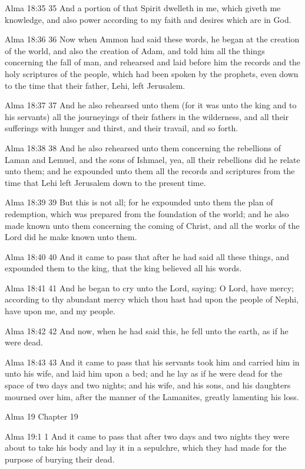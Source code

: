 Alma 18:35
 35 And a portion of that Spirit dwelleth in me, which giveth me
knowledge, and also power according to my faith and desires which
are in God.

Alma 18:36
 36 Now when Ammon had said these words, he began at the creation
of the world, and also the creation of Adam, and told him all the
things concerning the fall of man, and rehearsed and laid before
him the records and the holy scriptures of the people, which had
been spoken by the prophets, even down to the time that their
father, Lehi, left Jerusalem.

Alma 18:37
 37 And he also rehearsed unto them (for it was unto the king and
to his servants) all the journeyings of their fathers in the
wilderness, and all their sufferings with hunger and thirst, and
their travail, and so forth.

Alma 18:38
 38 And he also rehearsed unto them concerning the rebellions of
Laman and Lemuel, and the sons of Ishmael, yea, all their
rebellions did he relate unto them; and he expounded unto them
all the records and scriptures from the time that Lehi left
Jerusalem down to the present time.

Alma 18:39
 39 But this is not all; for he expounded unto them the plan of
redemption, which was prepared from the foundation of the world;
and he also made known unto them concerning the coming of Christ,
and all the works of the Lord did he make known unto them.

Alma 18:40
 40 And it came to pass that after he had said all these things,
and expounded them to the king, that the king believed all his
words.

Alma 18:41
 41 And he began to cry unto the Lord, saying: O Lord, have
mercy; according to thy abundant mercy which thou hast had upon
the people of Nephi, have upon me, and my people.

Alma 18:42
 42 And now, when he had said this, he fell unto the earth, as if
he were dead.

Alma 18:43
 43 And it came to pass that his servants took him and carried
him in unto his wife, and laid him upon a bed; and he lay as if
he were dead for the space of two days and two nights; and his
wife, and his sons, and his daughters mourned over him, after the
manner of the Lamanites, greatly lamenting his loss.

Alma 19
Chapter 19

Alma 19:1
 1 And it came to pass that after two days and two nights they
were about to take his body and lay it in a sepulchre, which they
had made for the purpose of burying their dead.

